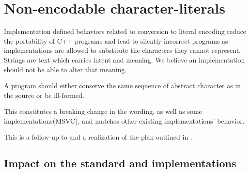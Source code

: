 \documentclass{wg21}
\begin{document}
    
    \section{Non-encodable character-literals}
    
    Implementation defined behaviors related to conversion to literal encoding reduce the portability of C++ programs and lead to silently incorrect
    programs as implementations are allowed to substitute the characters they cannot represent.
    Strings are text which carries intent and meaning. We believe an implementation should not be able to alter that meaning.
    
    A program should either conserve the same sequence of abstract character as in the source or be ill-formed.
    
    This constitutes a breaking change in the wording, as well as some implementations(MSVC), and matches other existing implementations' behavior.
    
    
    This is a follow-up to  and a realization of the plan outlined in .
    
    \subsection{Impact on the standard and implementations}
    
\end{document}
